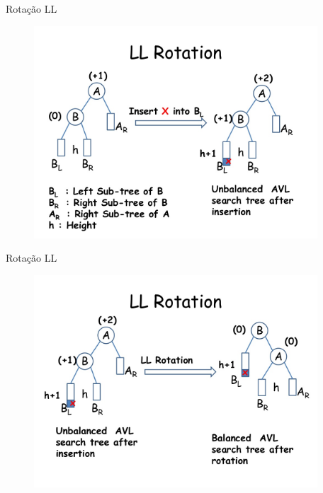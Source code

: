 \documentclass[aspectratio=169]{beamer}
\begin{document}

\begin{frame}{Rotação LL}
\begin{figure}[!h]
  \centering
  \includegraphics[width=300pt]{imagens/ll_rotation.png}
  \label{fig_ll_rotation}
\end{figure}
\end{frame}


\begin{frame}{Rotação LL}
\begin{figure}[!h]
  \centering
  \includegraphics[width=300pt]{imagens/ll_rotation1.png}
  \label{fig_ll_rotation1}
\end{figure}
\end{frame}

\end{document}
